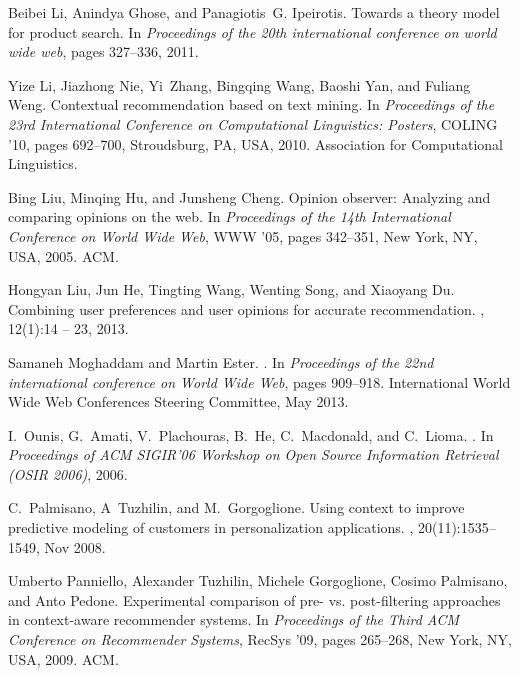 \documentclass[sigconf]{acmart}
\begin{document}
\begin{thebibliography}{10}
Beibei Li, Anindya Ghose, and Panagiotis~G. Ipeirotis.
\newblock Towards a theory model for product search.
\newblock In {\em Proceedings of the 20th international conference on world
  wide web}, pages 327--336, 2011.

Yize Li, Jiazhong Nie, Yi~Zhang, Bingqing Wang, Baoshi Yan, and Fuliang Weng.
\newblock Contextual recommendation based on text mining.
\newblock In {\em Proceedings of the 23rd International Conference on
  Computational Linguistics: Posters}, COLING '10, pages 692--700, Stroudsburg,
  PA, USA, 2010. Association for Computational Linguistics.

Bing Liu, Minqing Hu, and Junsheng Cheng.
\newblock Opinion observer: Analyzing and comparing opinions on the web.
\newblock In {\em Proceedings of the 14th International Conference on World
  Wide Web}, WWW '05, pages 342--351, New York, NY, USA, 2005. ACM.

Hongyan Liu, Jun He, Tingting Wang, Wenting Song, and Xiaoyang Du.
\newblock Combining user preferences and user opinions for accurate
  recommendation.
, 12(1):14 -- 23,
  2013.

Samaneh Moghaddam and Martin Ester.
.
\newblock In {\em Proceedings of the 22nd international conference on World
  Wide Web}, pages 909--918. International World Wide Web Conferences Steering
  Committee, May 2013.

I.~Ounis, G.~Amati, V.~Plachouras, B.~He, C.~Macdonald, and C.~Lioma.
.
\newblock In {\em Proceedings of ACM SIGIR'06 Workshop on Open Source
  Information Retrieval (OSIR 2006)}, 2006.

C.~Palmisano, A~Tuzhilin, and M.~Gorgoglione.
\newblock Using context to improve predictive modeling of customers in
  personalization applications.
,
  20(11):1535--1549, Nov 2008.

Umberto Panniello, Alexander Tuzhilin, Michele Gorgoglione, Cosimo Palmisano,
  and Anto Pedone.
\newblock Experimental comparison of pre- vs. post-filtering approaches in
  context-aware recommender systems.
\newblock In {\em Proceedings of the Third ACM Conference on Recommender
  Systems}, RecSys '09, pages 265--268, New York, NY, USA, 2009. ACM.


\end{thebibliography}
\end{document}
